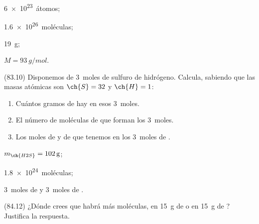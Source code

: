       \begin{solution}
        \begin{enumerate*}
          \item \SI{6e23}{átomos}; \item \SI{1.6e26}{moléculas}; \item \SI{19}{g}; \item \( M = \SI{93}{g/mol} \).
        \end{enumerate*}
      \end{solution}




      \begin{exercise}[
          tags    = {},
          topics  = {química,química básica},
          source  = {FQ 1B MGH 2016, p83, e10},
        ]
        (83.10) Disponemos de \SI{3}{moles} de sulfuro de hidrógeno. Calcula,
        sabiendo que las masas atómicas son \( \ch{S} = 32 \) y \( \ch{H} = 1 \):
        \begin{enumerate}
          \item Cuántos gramos de  hay en esos \SI{3}{moles}.
          \item El número de moléculas de  que forman los \SI{3}{moles}.
          \item Los moles de  y de  que tenemos en los \SI{3}{moles} de .
        \end{enumerate}
      \end{exercise}

      \begin{solution}
        \begin{enumerate*}
          \item \( m_{\ch{H2S}} = \SI{102}{\gram} \);
          \item \SI{1.8e24}{moléculas};
          \item \SI{3}{moles} de  y \SI{3}{moles} de .
        \end{enumerate*}
      \end{solution}




      \begin{exercise}[
          tags    = {},
          topics  = {química,química básica},
          source  = {FQ 1B MGH 2016, p84, e12},
        ]
        (84.12) ¿Dónde crees que habrá más moléculas, en \SI{15}{g} de  o en
        \SI{15}{g} de ? Justifica la respuesta.
      \end{exercise}

